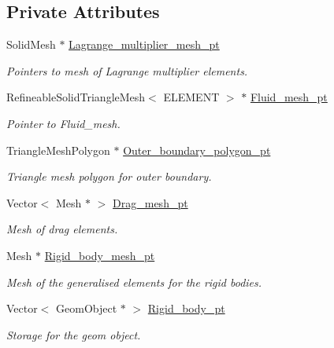 \subsection*{Private Attributes}
\begin{DoxyCompactItemize}
\item 
Solid\+Mesh $\ast$ \hyperlink{classUnstructuredImmersedEllipseProblem_ad644e67ccd6ab0811c5fe2b7b944fbca}{Lagrange\+\_\+multiplier\+\_\+mesh\+\_\+pt}
\begin{DoxyCompactList}\small\item\em Pointers to mesh of Lagrange multiplier elements. \end{DoxyCompactList}\item 
Refineable\+Solid\+Triangle\+Mesh$<$ E\+L\+E\+M\+E\+NT $>$ $\ast$ \hyperlink{classUnstructuredImmersedEllipseProblem_a0ba79ccde26b781b66d9839460f08bd3}{Fluid\+\_\+mesh\+\_\+pt}
\begin{DoxyCompactList}\small\item\em Pointer to Fluid\+\_\+mesh. \end{DoxyCompactList}\item 
Triangle\+Mesh\+Polygon $\ast$ \hyperlink{classUnstructuredImmersedEllipseProblem_ae0b35188432c371804887b6de86b48c7}{Outer\+\_\+boundary\+\_\+polygon\+\_\+pt}
\begin{DoxyCompactList}\small\item\em Triangle mesh polygon for outer boundary. \end{DoxyCompactList}\item 
Vector$<$ Mesh $\ast$ $>$ \hyperlink{classUnstructuredImmersedEllipseProblem_a9b4d04277b1f42c9428b610968f6f10d}{Drag\+\_\+mesh\+\_\+pt}
\begin{DoxyCompactList}\small\item\em Mesh of drag elements. \end{DoxyCompactList}\item 
Mesh $\ast$ \hyperlink{classUnstructuredImmersedEllipseProblem_a34f1376227d4b995678eedd77813388b}{Rigid\+\_\+body\+\_\+mesh\+\_\+pt}
\begin{DoxyCompactList}\small\item\em Mesh of the generalised elements for the rigid bodies. \end{DoxyCompactList}\item 
Vector$<$ Geom\+Object $\ast$ $>$ \hyperlink{classUnstructuredImmersedEllipseProblem_aaa6d1c19f3634a6f08f3dd7e5046217e}{Rigid\+\_\+body\+\_\+pt}
\begin{DoxyCompactList}\small\item\em Storage for the geom object. \end{DoxyCompactList}\item 

\end{DoxyCompactItemize}
